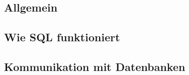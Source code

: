 \subsection{Allgemein}

\subsection{Wie SQL funktioniert}

\subsection{Kommunikation mit Datenbanken}

